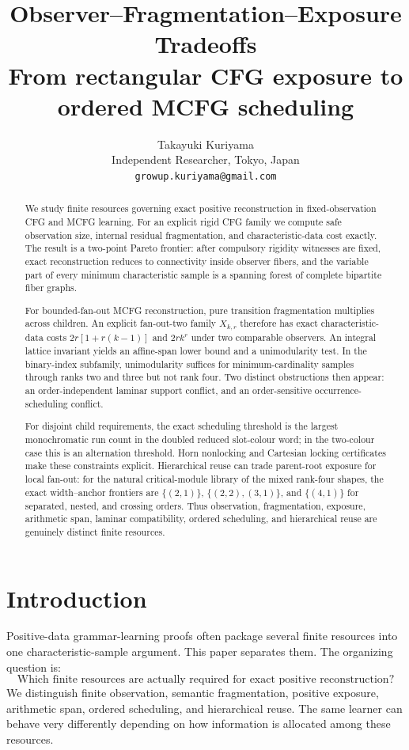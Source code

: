 \documentclass[11pt]{article}
\title{Observer--Fragmentation--Exposure Tradeoffs\\
\large From rectangular CFG exposure to ordered MCFG scheduling}
\author{Takayuki Kuriyama\\
Independent Researcher, Tokyo, Japan\\
\texttt{growup.kuriyama@gmail.com}}
\date{}
\begin{document}
\maketitle

\begin{abstract}
We study finite resources governing exact positive reconstruction in fixed-observation CFG and MCFG learning.  For an explicit rigid CFG family we compute safe observation size, internal residual fragmentation, and characteristic-data cost exactly.  The result is a two-point Pareto frontier: after compulsory rigidity witnesses are fixed, exact reconstruction reduces to connectivity inside observer fibers, and the variable part of every minimum characteristic sample is a spanning forest of complete bipartite fiber graphs.

For bounded-fan-out MCFG reconstruction, pure transition fragmentation multiplies across children.  An explicit fan-out-two family $X_{k,r}$ therefore has exact characteristic-data costs $2r[1+r(k-1)]$ and $2rk^r$ under two comparable observers.  An integral lattice invariant yields an affine-span lower bound and a unimodularity test.  In the binary-index subfamily, unimodularity suffices for minimum-cardinality samples through ranks two and three but not rank four.  Two distinct obstructions then appear: an order-independent laminar support conflict, and an order-sensitive occurrence-scheduling conflict.

For disjoint child requirements, the exact scheduling threshold is the largest monochromatic run count in the doubled reduced slot-colour word; in the two-colour case this is an alternation threshold.  Horn nonlocking and Cartesian locking certificates make these constraints explicit.  Hierarchical reuse can trade parent-root exposure for local fan-out: for the natural critical-module library of the mixed rank-four shapes, the exact width--anchor frontiers are $\{(2,1)\}$, $\{(2,2),(3,1)\}$, and $\{(4,1)\}$ for separated, nested, and crossing orders.  Thus observation, fragmentation, exposure, arithmetic span, laminar compatibility, ordered scheduling, and hierarchical reuse are genuinely distinct finite resources.
\end{abstract}

\section{Introduction}
\label{sec:introduction}

Positive-data grammar-learning proofs often package several finite resources
into one characteristic-sample argument.  This paper separates them.  The
organizing question is:
\[
 \boxed{\text{Which finite resources are actually required for exact positive reconstruction?}}
\]
We distinguish finite observation, semantic fragmentation, positive exposure,
arithmetic span, ordered scheduling, and hierarchical reuse.  The same
learner can behave very differently depending on how information is allocated
among these resources.
\end{document}
